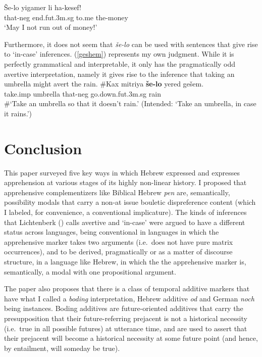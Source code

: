 \documentclass[output=paper,colorlinks,citecolor=brown]{langscibook}
\begin{document}
\ea
\label{wish}
\gll \v{S}e-lo yigamer li ha-kesef! \\
that-{\sc neg} end.{\sc fut.3m.sg} to.me the-money\\
\glt `May I not run out of money!'
\z

Furthermore, it  does not seem that \textit{še-lo} can be used with sentences that give rise to `in-case' inferences. (\ref{geshem}) represents my own judgment. While it is perfectly grammatical and interpretable, it only has the pragmatically odd avertive interpretation, namely it gives rise to the inference that taking an umbrella might avert the rain.
\ea
\label{geshem}
\gll \#Kax mitriya \textbf{še-lo} yered gešem. \\
take.{\sc imp} umbrella that-{\sc neg} go.down.{\sc fut.3m.sg} rain \\
\glt \#`Take an umbrella so that it doesn't rain.' (Intended: `Take an umbrella, in case it rains.') 
\z


\section{Conclusion}
\label{sec:conclusion}

This paper surveyed five key ways in which Hebrew expressed and expresses apprehension at various stages of its highly non-linear history. I proposed that apprehensive complementizers like Biblical Hebrew \textit{pen} are, semantically, possibility modals that carry a non-at issue bouletic dispreference content (which I labeled, for convenience, a conventional implicature). The kinds of inferences that Lichtenberk (\citeyear{lichtenberk95}) calls avertive and `in-case' were argued to have a different status across languages, being conventional in languages in which the apprehensive marker takes two arguments (i.e.\ does not have pure matrix occurrences), and to be derived, pragmatically or as a matter of discourse structure, in a language like Hebrew, in which the the apprehensive marker is, semantically, a modal with one propositional argument. 

The paper also proposes that there is a class of temporal additive markers that have what I called a \textit{boding} interpretation, Hebrew additive \textit{od} and German \textit{noch} being instances. Boding additives are future-oriented additives that carry the presupposition that their future-referring prejacent is not a historical necessity (i.e.\ true in all possible futures) at utterance time, and are used to assert that their prejacent will become a historical necessity at some future point (and hence, by entailment, will someday be true).
\end{document}
